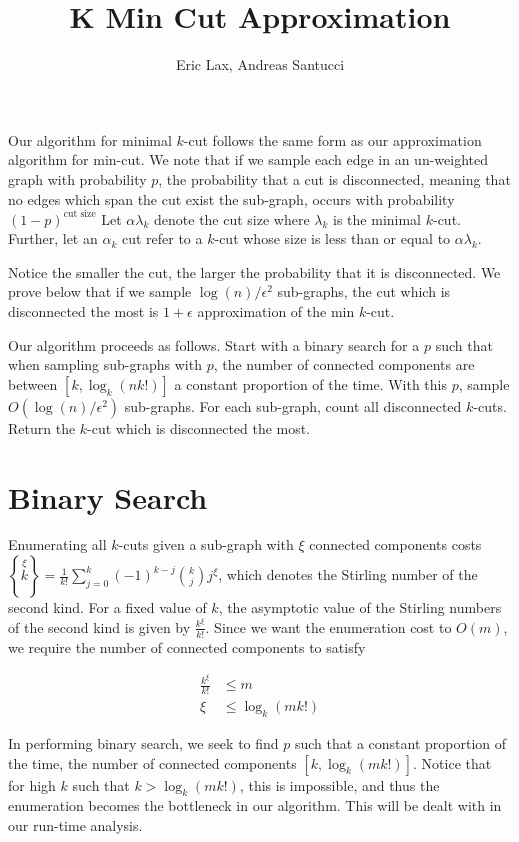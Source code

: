 \documentclass[12pt]{article}
\begin{document}
 

\title{\textbf{K Min Cut Approximation}}
\author{Eric Lax, Andreas Santucci}
\maketitle

Our algorithm for minimal $k$-cut follows the same form as our approximation algorithm for min-cut. We note that if we sample each edge in an un-weighted graph with probability $p$, the probability that a cut is disconnected, meaning that no edges which span the cut exist the sub-graph, occurs with probability $(1-p)^{\text{cut size}}$ Let $\alpha \lambda_k$ denote the cut size where $\lambda_k$ is the minimal $k$-cut. Further, let an $\alpha_k$ cut refer to a $k$-cut whose size is less than or equal to $\alpha \lambda_k$. 

Notice the smaller the cut, the larger the probability that it is disconnected. We prove below that if we sample $\log(n)/\epsilon^2$ sub-graphs,  the cut which is disconnected the most is $1+\epsilon$ approximation of the min $k$-cut.

Our algorithm proceeds as follows. Start with a binary search for a $p$ such that when sampling sub-graphs with $p$, the number of connected components are between $[k, \log_k(n k!)]$ a constant proportion of the time. With this $p$, sample $O(\log(n)/\epsilon^2)$ sub-graphs. For each sub-graph, count all disconnected $k$-cuts. Return the $k$-cut which is disconnected the most.

\section{Binary Search} Enumerating all $k$-cuts given a sub-graph with $\xi$ connected components costs $\left \{ \overset{\xi}{k} \right \} = \frac{1}{k!} \sum_{j=0}^k (-1)^{k-j} \binom{k}{j} j^\xi$, which denotes the Stirling number of the second kind. For a fixed value of $k$, the asymptotic value of the Stirling numbers of the second kind is given by $\frac{k^\xi}{k!}$. Since we want the enumeration cost to $O(m)$, we require the number of connected components to satisfy

\begin{align*}
\frac{k^\xi}{k!} &\leq m \\
\xi &\leq \log_k(m k!) 
\end{align*}

In performing binary search, we seek to find $p$ such that a constant proportion of the time, the number of connected components 
$[k, \log_k(m k!)]$. Notice that for high $k$ such that 
$k > \log_k(mk!)$, this is impossible, and thus the enumeration becomes the bottleneck in our algorithm. This will be dealt with in our run-time analysis.
\end{document}
